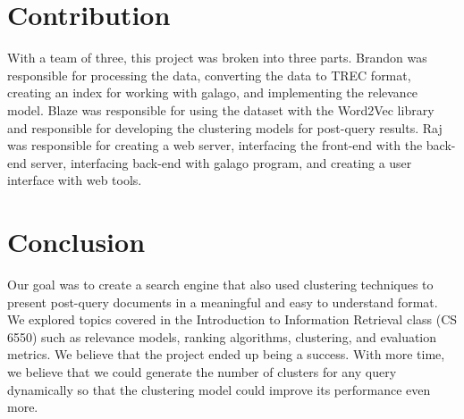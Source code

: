 \documentclass[sigconf]{acmart}
\begin{document}
\section{Contribution}
With a team of three, this project was broken into three parts. Brandon was responsible for processing the data, converting the data to TREC format, creating an index for working with galago, and implementing the relevance model. Blaze was responsible for using the dataset with the Word2Vec library and responsible for developing the clustering models for post-query results. Raj was responsible for creating a web server, interfacing the front-end with the back-end server, interfacing back-end with galago program, and creating a user interface with web tools. 

\section{Conclusion}
Our goal was to create a search engine that also used clustering techniques to present post-query documents in a meaningful and easy to understand format. We explored topics covered in the Introduction to Information Retrieval class (CS 6550) such as relevance models, ranking algorithms, clustering, and evaluation metrics. We believe that the project ended up being a success. With more time, we believe that we could generate the number of clusters for any query dynamically so that the clustering model could improve its performance even more.



\end{document}
